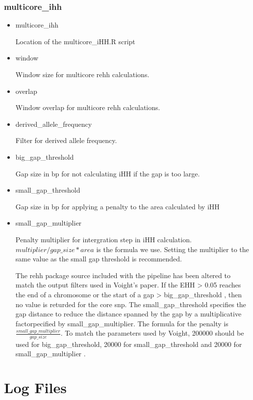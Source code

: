 \documentclass[a4paper,10pt]{article}
\begin{document}
\subsubsection{multicore\_ihh}
\begin{itemize}
\item multicore\_ihh

Location of the multicore\_iHH.R script

\item window

Window size for multicore rehh calculations.  

\item overlap

Window overlap for multicore rehh calculations.

\item derived\_allele\_frequency

Filter for derived allele frequency.

\item big\_gap\_threshold

Gap size in bp for not calculating iHH if the gap is too large.

\item small\_gap\_threshold

Gap size in bp for applying a penalty to the area calculated by iHH

\item small\_gap\_multiplier

Penalty multiplier for intergration step in iHH calculation. $multiplier/gap\_size * area$ is the formula we use. Setting the multiplier to the same value as the small gap threshold is recommended.

The rehh package source included with the pipeline has been altered to match the output filters used in Voight's paper. If the EHH > 0.05 reaches the end of a chromosome or the start of a gap > big\_gap\_threshold , then no value is returded for the core snp. The small\_gap\_threshold specifies the gap distance to reduce the distance spanned by the gap by a multiplicative factorpecified by small\_gap\_multiplier. The formula for the penalty is $\frac{small\_gap\_multiplier}{gap\_size}$. To match the parameters used by Voight, 200000 should be  used for big\_gap\_threshold, 20000 for small\_gap\_threshold and 20000 for small\_gap\_multiplier \citep{Voight:2006go}.

\end{itemize}
\section{Log Files}
\end{document}
